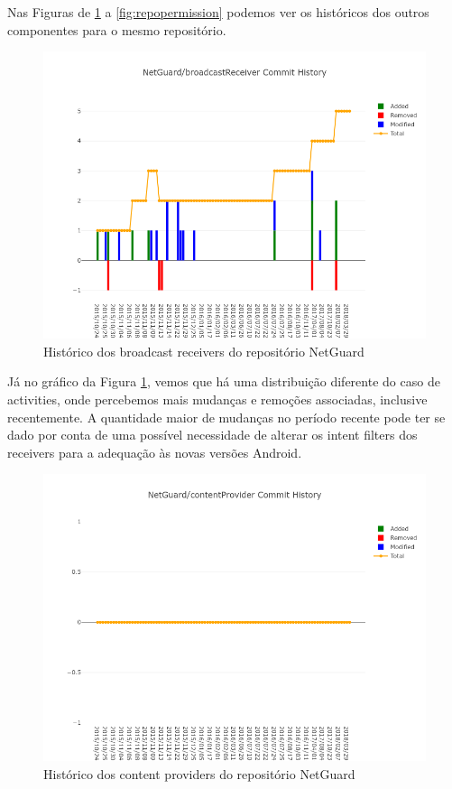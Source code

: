 \documentclass[a4paper,12pt]{article}
\begin{document}
{Nas Figuras de \ref{fig:repobroadcast} a \ref{fig:repopermission} podemos ver os históricos dos outros componentes para o mesmo repositório.

\begin{figure}[H]
\centering
\includegraphics[width=\linewidth,height=0.5\linewidth]{imgs/NetGuard_broadcastReceiver_history.png}
\caption{Histórico dos broadcast receivers do repositório NetGuard}
\label{fig:repobroadcast}
\end{figure}

Já no gráfico da Figura \ref{fig:repobroadcast}, vemos que há uma distribuição diferente do caso de activities, onde percebemos mais mudanças e remoções associadas, inclusive recentemente. A quantidade maior de mudanças no período recente pode ter se dado por conta de uma possível necessidade de alterar os intent filters dos receivers para a adequação às novas versões Android.

\begin{figure}[H]
\centering
\includegraphics[width=\linewidth,height=0.5\linewidth]{imgs/NetGuard_contentProvider_history.png}
\caption{Histórico dos content providers do repositório NetGuard}
\label{fig:repoprovider}
\end{figure}


}
\end{document}
